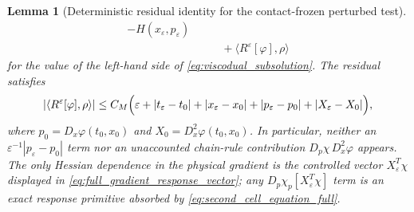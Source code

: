 \documentclass[12pt, letterpaper]{amsart}
\theoremstyle{plain}
\newtheorem{lemma}[theorem]{Lemma}
\theoremstyle{definition}
\theoremstyle{remark}
\begin{document}
\begin{lemma}[Deterministic residual identity for the contact-frozen perturbed test]
\begin{equation}
\begin{split}
 -H(x_\varepsilon,p_\varepsilon)  \\
&\qquad
 +\langle R^\varepsilon[\varphi],\rho\rangle
\end{split}
\end{equation}
for the value of the left-hand side of \eqref{eq:viscodual_subsolution}.  The
residual satisfies
\begin{equation}
\label{eq:deterministic_residual_identity_bound}
    |\langle R^\varepsilon[\varphi],\rho\rangle|
    \le C_M\Bigl(\varepsilon
       +|t_\varepsilon-t_0|+|x_\varepsilon-x_0|
       +|p_\varepsilon-p_0|+|X_\varepsilon-X_0|\Bigr),
\end{equation}
where $p_0=D_x\varphi(t_0,x_0)$ and $X_0=D_x^2\varphi(t_0,x_0)$.  In
particular, neither an $\varepsilon^{-1}|p_\varepsilon-p_0|$ term nor an
unaccounted chain-rule contribution $D_p\chi\,D_x^2\varphi$ appears.  The only
Hessian dependence in the physical gradient is the controlled vector
$X_\varepsilon^T\chi$ displayed in \eqref{eq:full_gradient_response_vector}; any
$D_p\chi_p[ X_\varepsilon^T\chi]$ term is an exact response primitive absorbed
by \eqref{eq:second_cell_equation_full}.
\end{lemma}
\end{document}
